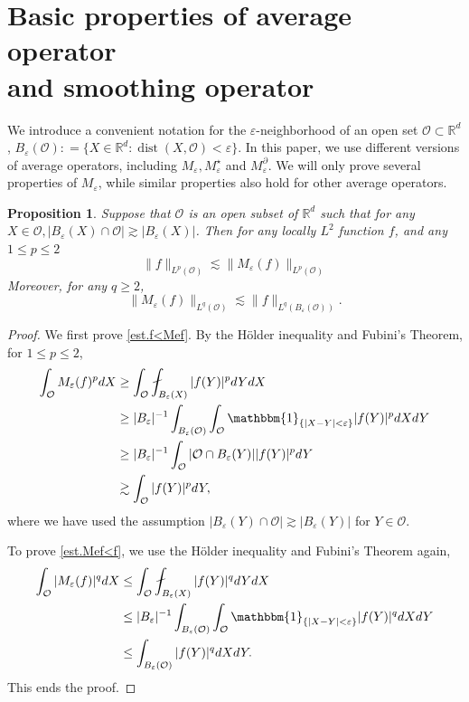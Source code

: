 \documentclass[reqno,12pt]{amsart} %
\newtheorem{proposition}[theorem]{Proposition}
\theoremstyle{definition}
\theoremstyle{remark}
\numberwithin{equation}{section}
\newcommand{\R}{\mathbb{R}}
\newcommand{\e}{\varepsilon}
\DeclareMathOperator{\dist}{dist}
\begin{document}
\section{Basic properties of average operator \\and smoothing operator}

We introduce a convenient notation for the $\e$-neighborhood of an open set $\mathcal{O} \subset \R^d$, $B_\e(\mathcal{O}): = \{ X\in \R^d: \dist(X,\mathcal{O}) < \e \}$.
In this paper, we use different versions of average operators, including $M_\e, M_\e^{\star}$ and $M_\e^\partial$. We will only prove several properties of $M_\e$, while similar properties also hold for other average operators.

\begin{proposition}\label{prop.A1}
    Suppose that $\mathcal{O}$ is an open subset of $\R^d$ such that for any $X \in \mathcal{O}, |B_\e(X) \cap \mathcal{O}| \gtrsim |B_\e(X)|$. Then for any locally $L^2$ function $f$, and any $1\le p\le 2$
    \begin{equation}\label{est.f<Mef}
        \| f \|_{L^p(\mathcal{O})} \lesssim \| M_\e( f) \|_{L^p(\mathcal{O})}
    \end{equation}
    Moreover, for any $q \ge 2$,
    \begin{equation}\label{est.Mef<f}
        \| M_\e( f) \|_{L^q(\mathcal{O})} \lesssim \| f \|_{L^q(B_\e(\mathcal{O}))}.
    \end{equation}
\end{proposition}
\begin{proof}
    We first prove \eqref{est.f<Mef}. By the H\"{o}lder inequality and Fubini's Theorem, for $1\le p\le 2$,
    \begin{equation}
    \begin{aligned}
        \int_{\mathcal{O}} M_\e(f)^p dX & \ge \int_{\mathcal{O}} \fint_{B_\e(X)} |f(Y)|^p dY dX \\
        & \ge |B_\e|^{-1} \int_{B_\e(\mathcal{O})} \int_{\mathcal{O}} \mathbbm{1}_{\{|X-Y|<\e\} } |f(Y)|^p dX dY \\
        & \ge |B_\e|^{-1} \int_{\mathcal{O}} |\mathcal{O} \cap B_\e(Y)| |f(Y)|^p dY \\
        & \gtrsim \int_{\mathcal{O}} |f(Y)|^p dY,
    \end{aligned}
    \end{equation}
    where we have used the assumption $|B_\e(Y) \cap \mathcal{O}| \gtrsim |B_\e(Y)|$ for $Y\in \mathcal{O}$.

    To prove \eqref{est.Mef<f}, we use the H\"{o}lder inequality and Fubini's Theorem again,
    \begin{equation}
    \begin{aligned}
        \int_{\mathcal{O}} |M_\e(f)|^q dX & \le \int_{\mathcal{O}} \fint_{B_\e(X)} |f(Y)|^q dY dX \\
        & \le |B_\e|^{-1} \int_{B_\e(\mathcal{O})} \int_{\mathcal{O}} \mathbbm{1}_{\{|X-Y| < \e \} } |f(Y)|^q dX dY  \\
        & \le \int_{B_\e(\mathcal{O})} |f(Y)|^q dX dY.
        \end{aligned}
    \end{equation}
    This ends the proof.
\end{proof}
\end{document}
